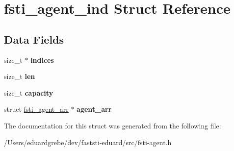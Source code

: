 \hypertarget{structfsti__agent__ind}{}\section{fsti\+\_\+agent\+\_\+ind Struct Reference}
\label{structfsti__agent__ind}
\subsection*{Data Fields}
\begin{DoxyCompactItemize}
\item 
\mbox{\label{structfsti__agent__ind_a2892aba8fbb99f0ceb363c434c861e4f}} 
size\+\_\+t $\ast$ {\bfseries indices}
\item 
\mbox{\label{structfsti__agent__ind_aa1deb5291b58997006ed73cdfdacb946}} 
size\+\_\+t {\bfseries len}
\item 
\mbox{\label{structfsti__agent__ind_a04dc165ff5ad97307c8881aa2e230455}} 
size\+\_\+t {\bfseries capacity}
\item 
\mbox{\label{structfsti__agent__ind_a6fb589d3c9ed085bff1be5f3e90f6ccb}} 
struct \mbox{\hyperlink{structfsti__agent__arr}{fsti\+\_\+agent\+\_\+arr}} $\ast$ {\bfseries agent\+\_\+arr}
\end{DoxyCompactItemize}


The documentation for this struct was generated from the following file\+:\begin{DoxyCompactItemize}
\item 
/\+Users/eduardgrebe/dev/faststi-\/eduard/src/fsti-\/agent.\+h\end{DoxyCompactItemize}
